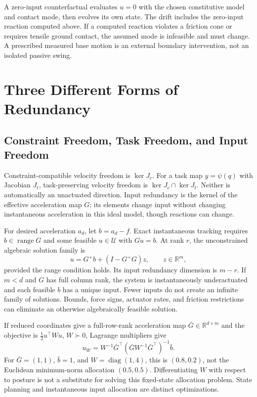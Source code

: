 A zero-input counterfactual evaluates $u=0$ with the chosen constitutive model and contact mode, then evolves its own state. The drift includes the zero-input reaction computed above. If a computed reaction violates a friction cone or requires tensile ground contact, the assumed mode is infeasible and must change. A prescribed measured base motion is an external boundary intervention, not an isolated passive swing.

\section{Three Different Forms of Redundancy}
\label{sec:ch9:null-space}

\subsection{Constraint Freedom, Task Freedom, and Input Freedom}

Constraint-compatible velocity freedom is $\ker J_c$. For a task map $y=\psi(q)$ with Jacobian $J_t$, task-preserving velocity freedom is $\ker J_c\cap\ker J_t$. Neither is automatically an unactuated direction. Input redundancy is the kernel of the effective acceleration map $G$; its elements change input without changing instantaneous acceleration in this ideal model, though reactions can change.

For desired acceleration $a_d$, let $b=a_d-f$. Exact instantaneous tracking requires $b\in\operatorname{range}G$ and some feasible $u\in\mathcal U$ with $Gu=b$. At rank $r$, the unconstrained algebraic solution family is
\begin{equation}
 u=G^+b+(I-G^+G)z,\qquad z\in\mathbb R^m,
 \label{eq:ch9:general-control}
\end{equation}
provided the range condition holds. Its input redundancy dimension is $m-r$. If $m<d$ and $G$ has full column rank, the system is instantaneously underactuated and each feasible $b$ has a unique input. Fewer inputs do not create an infinite family of solutions. Bounds, force signs, actuator rates, and friction restrictions can eliminate an otherwise algebraically feasible solution.

If reduced coordinates give a full-row-rank acceleration map $\bar G\in\mathbb R^{d\times m}$ and the objective is $\tfrac12u^\top Wu$, $W\succ0$, Lagrange multipliers give
\begin{equation}
 u_W=W^{-1}\bar G^\top(\bar G W^{-1}\bar G^\top)^{-1}\bar b.
 \label{eq:ch9:optimal-null-space}
\end{equation}
For $\bar G=(1,1)$, $\bar b=1$, and $W=\operatorname{diag}(1,4)$, this is $(0.8,0.2)$, not the Euclidean minimum-norm allocation $(0.5,0.5)$. Differentiating $W$ with respect to posture is not a substitute for solving this fixed-state allocation problem. State planning and instantaneous input allocation are distinct optimizations.

